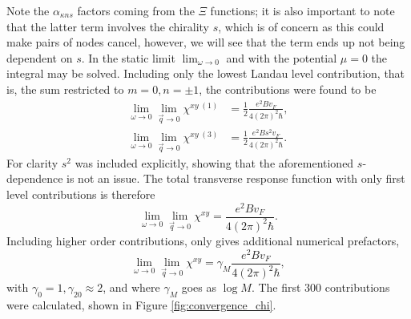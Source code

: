 Note the $\alpha _{\kappa ns}$ factors coming from the $\Xi $ functions;
it is also important to note that the latter term involves the chirality $s$, which is of concern as this could make pairs of nodes cancel, however, we will see that the term ends up not being dependent on $s$.
In the static limit $\lim_{\omega \to 0}$ and with the potential $\mu =0$ the integral may be solved.
Including only the lowest Landau level contribution, that is, the sum restricted to $m=0, n=\pm 1$, the contributions were found to be
\begin{align}
  \lim_{\omega \to  0} \lim_{\vec{q}\to 0}
  \chi ^{xy \; (1)}
  &= \frac{1}{2} \frac{e^2B v_F}{4 (2\pi )^2 \hbar },\\
  \lim_{\omega \to  0} \lim_{\vec{q}\to 0}
  \chi ^{xy \; (3)}
  &= \frac{1}{2} \frac{e^2B s^2 v_F}{4 (2\pi )^2 \hbar }.
\end{align}
For clarity $s^2$ was included explicitly, showing that the aforementioned $s$-dependence is not an issue.
The total transverse response function with only first level contributions is therefore
\begin{equation}
  \lim_{\omega \to  0} \lim_{\vec{q}\to 0}
  \chi ^{xy}
  = \frac{e^2B v_F}{4 (2\pi )^2 \hbar }.
\end{equation}
Including higher order contributions, only gives additional numerical prefactors,
\begin{equation}
 \label{eq:35} 
  \lim_{\omega \to  0} \lim_{\vec{q}\to 0}
  \chi ^{xy}
  = \gamma_M \frac{e^2B v_F}{4 (2\pi )^2 \hbar },
\end{equation}
with $\gamma _0 = 1, \gamma _{20} \approx 2$, and where $\gamma _M$ goes as $\log M$.
The first 300 contributions were calculated, shown in Figure \ref{fig:convergence_chi}.



